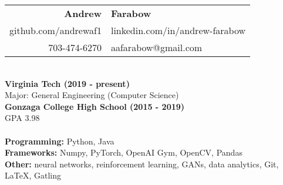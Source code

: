 \documentclass{article}
\begin{document}
  \begin{center}
    \begin{tabular}{r l}
      {\huge\textbf{Andrew}} & {\huge\textbf{Farabow}} \\
      \hspace{35pt} github.com/andrewaf1 & linkedin.com/in/andrew-farabow \\
      703-474-6270 & aafarabow@gmail.com \\
    \end{tabular}


  \begin{flushleft}
    \begin{multicols}{2}
      {\large\textbf{\underline{}}} \\
       \textbf{Virginia Tech	(2019 - present)} \\
      Major: General Engineering (Computer Science) \\
      \textbf{Gonzaga College High School	(2015 - 2019)} \\
      GPA 3.98 \\
     

    \columnbreak
    {\large\textbf{\underline{}}} \\
    {\textbf{Programming:}} Python, Java \\
    {\textbf{Frameworks:}} Numpy, PyTorch, OpenAI Gym, OpenCV, Pandas \\
    {\textbf{Other:}} neural networks, reinforcement learning, GANs, data analytics, Git, LaTeX, Gatling \\

    \end{multicols}


\end{flushleft}
\end{center}
\end{document}
